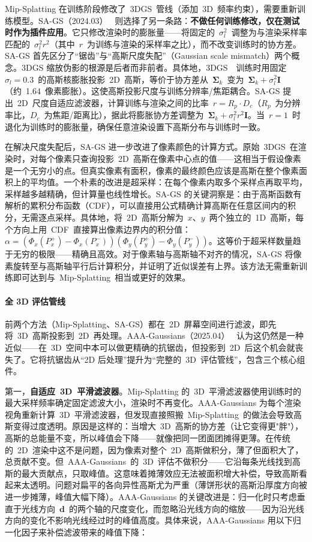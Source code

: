 Mip-Splatting 在训练阶段修改了~3DGS~管线（添加~3D~频率约束），需要重新训练模型。SA-GS（2024.03）~\cite{2403_19615} 则选择了另一条路：\textbf{不做任何训练修改，仅在测试时作为插件应用}。它只修改渲染时的膨胀量——将固定的~$\sigma_l^2$~调整为与渲染采样率匹配的~$\sigma_l^2 r^2$（其中~$r$~为训练与渲染的采样率之比），而不改变训练时的协方差。SA-GS 首先区分了``锯齿''与``高斯尺度失配''（Gaussian scale mismatch）两个概念。3DGS 缩放伪影的根源是后者而非前者。具体地，3DGS~\cite{2308_04079}~训练时用固定~$\sigma_l = 0.3$~的高斯核膨胀投影~2D~高斯，等价于协方差从~$\bm{\Sigma}_k$~变为~$\bm{\Sigma}_k + \sigma_l^2 \mathbf{I}$（约~1.64~像素膨胀）。这使高斯投影尺度与训练分辨率/焦距耦合。SA-GS 提出~2D~尺度自适应滤波器，计算训练与渲染之间的比率~$r = R_p \cdot D_c$（$R_p$~为分辨率比，$D_c$~为焦距/距离比），据此将膨胀协方差调整为~$\bm{\Sigma}_k + \sigma_l^2 r^2 \mathbf{I}$。当~$r=1$~时退化为训练时的膨胀量，确保任意渲染设置下高斯分布与训练时一致。

在解决尺度失配后，SA-GS 进一步改进了像素颜色的计算方式。原始~3DGS~在渲染时，对每个像素只查询投影~2D~高斯在像素中心点的值——这相当于假设像素是一个无穷小的点。但真实像素有面积，像素的最终颜色应该是高斯在整个像素面积上的平均值。一个朴素的改进是超采样：在每个像素内取多个采样点再取平均，采样越多越精确，但计算量也线性增长。SA-GS 的关键洞察是：由于高斯函数有解析的累积分布函数（CDF），可以直接用公式精确计算高斯在任意区间内的积分，无需逐点采样。具体地，将~2D~高斯分解为~$x$、$y$~两个独立的~1D~高斯，每个方向上用~CDF~直接算出像素边界内的积分值：$\alpha = (\Phi_x(P_x^+) - \Phi_x(P_x^-))(\Phi_y(P_y^+) - \Phi_y(P_y^-))$。这等价于超采样数量趋于无穷的极限——精确且高效。对于像素轴与高斯轴不对齐的情况，SA-GS 将像素旋转至与高斯轴平行后计算积分，并证明了近似误差有上界。该方法无需重新训练即可达到与~Mip-Splatting~相当或更好的效果。

\paragraph{全 3D 评估管线}

前两个方法（Mip-Splatting、SA-GS）都在~2D~屏幕空间进行滤波，即先将~3D~高斯投影到~2D~再处理。AAA-Gaussians（2025.04）~\cite{2504_12811} 认为这仍然是一种近似——在~3D~空间中本可以做更精确的抗锯齿，但投影到~2D~后这个机会就丧失了。它将抗锯齿从“2D 后处理”提升为“完整的~3D~评估管线”，包含三个核心组件。

第一，\textbf{自适应~3D~平滑滤波器}。Mip-Splatting 的~3D~平滑滤波器使用训练时的最大采样频率确定固定滤波大小，渲染时不再变化。AAA-Gaussians 为每个渲染视角重新计算~3D~平滑滤波器，但发现直接照搬~Mip-Splatting~的做法会导致高斯变得过度透明。原因是这样的：当增大~3D~高斯的协方差（让它变得更"胖"），高斯的总能量不变，所以峰值会下降——就像把同一团面团摊得更薄。在传统的~2D~渲染中这不是问题，因为像素对整个~2D~高斯做积分，薄了但面积大了，总贡献不变。但~AAA-Gaussians~的~3D~评估不做积分——它沿每条光线找到高斯的最大贡献点，只取峰值。这意味着摊薄效应无法被面积增大补偿，导致高斯看起来太透明。问题对扁平的各向异性高斯尤为严重（薄饼形状的高斯沿厚度方向被进一步摊薄，峰值大幅下降）。AAA-Gaussians 的关键改进是：归一化时只考虑垂直于光线方向~$\mathbf{d}$~的两个轴的尺度变化，而忽略沿光线方向的缩放——因为沿光线方向的变化不影响光线经过时的峰值高度。具体来说，AAA-Gaussians 用以下归一化因子来补偿滤波带来的峰值下降：


